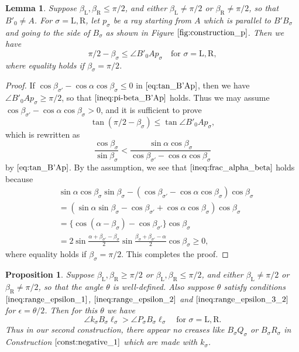 \documentclass[11pt]{amsart}
\newtheorem{proposition}[theorem]{Proposition}
\newtheorem{lemma}[theorem]{Lemma}
\numberwithin{equation}{section}
\numberwithin{theorem}{section}
\newcommand{\Lt}{\ensuremath{\mathrm{L}}}
\newcommand{\Rt}{\ensuremath{\mathrm{R}}}
\begin{document}
\begin{lemma}\label{lem:pi-beta_B'Ap}
Suppose $\beta_\Lt ,\beta_\Rt\leqslant\pi /2$, and either $\beta_\Lt\neq\pi /2$ or $\beta_\Rt\neq\pi /2$, so that $B'_0\neq A$.
For $\sigma =\Lt ,\Rt$, let $p_\sigma$ be a ray starting from $A$ which is parallel to $B'B_\sigma$ and going to the side of $B_\sigma$
as shown in Figure $\ref{fig:construction_p}$.
Then we have
\begin{equation}\label{ineq:pi-beta_B'Ap}
\pi /2-\beta_\sigma\leqslant\angle B'_0Ap_\sigma\quad\text{for }\sigma =\Lt ,\Rt ,
\end{equation}
where equality holds if $\beta_\sigma =\pi /2$.
\end{lemma}
\begin{proof}
If $\cos\beta_{\sigma'}-\cos\alpha\cos\beta_\sigma\leqslant 0$ in $\eqref{eq:tan_B'Ap}$, then we have $\angle B'_0Ap_\sigma\geqslant\pi /2$, so that
$\eqref{ineq:pi-beta_B'Ap}$ holds.
Thus we may assume $\cos\beta_{\sigma'}-\cos\alpha\cos\beta_\sigma >0$,
and it is sufficient to prove 
\begin{equation*}
\tan (\pi /2-\beta_\sigma )\leqslant\tan\angle B'_0Ap_\sigma ,
\end{equation*}
which is rewritten as
\begin{equation}\label{ineq:frac_alpha_beta}
\frac{\cos\beta_\sigma}{\sin\beta_\sigma}<\frac{\sin\alpha\cos\beta_\sigma}{\cos\beta_{\sigma'}-\cos\alpha\cos\beta_\sigma}
\end{equation}
by $\eqref{eq:tan_B'Ap}$.
By the assumption, we see that $\eqref{ineq:frac_alpha_beta}$ holds because
\begin{align*}
&\sin\alpha\cos\beta_\sigma\sin\beta_\sigma-(\cos\beta_{\sigma'}-\cos\alpha\cos\beta_\sigma )\cos\beta_\sigma\\
&=(\sin\alpha\sin\beta_\sigma -\cos\beta_{\sigma'}+\cos\alpha\cos\beta_\sigma )\cos\beta_\sigma\\
&=\{\cos (\alpha -\beta_\sigma )-\cos\beta_{\sigma'}\}\cos\beta_\sigma\\
&=2\sin\frac{\alpha +\beta_{\sigma'}-\beta_\sigma}{2}\sin\frac{\beta_\sigma +\beta_{\sigma'}-\alpha}{2}\cos\beta_\sigma\geqslant 0,
\end{align*}
where equality holds if $\beta_\sigma =\pi /2$.
This completes the proof.
\end{proof}
\begin{proposition}\label{prop:kBl>PBl}
Suppose $\beta_\Lt ,\beta_\Rt\geqslant\pi /2$ or $\beta_\Lt ,\beta_\Rt\leqslant\pi /2$, and either $\beta_\Lt\neq\pi /2$ or $\beta_\Rt\neq\pi /2$,
so that the angle $\theta$ is well-defined.
Also suppose $\theta$ satisfy conditions $\eqref{ineq:range_epsilon_1}$, $\eqref{ineq:range_epsilon_2}$
and $\eqref{ineq:range_epsilon_3_2}$ for $\epsilon =\theta /2$.
Then for this $\theta$ we have
\begin{equation*}
\angle k_\sigma B_\sigma\ell_\sigma >\angle P_\sigma B_\sigma\ell_\sigma\quad\text{for }\sigma =\Lt ,\Rt .
\end{equation*}
Thus in our second construction,
there appear no creases like $B_\sigma Q_\sigma$ or $B_\sigma R_\sigma$ in Construction $\ref{const:negative_1}$ which are made with $k_\sigma$.
\end{proposition}
\end{document}
